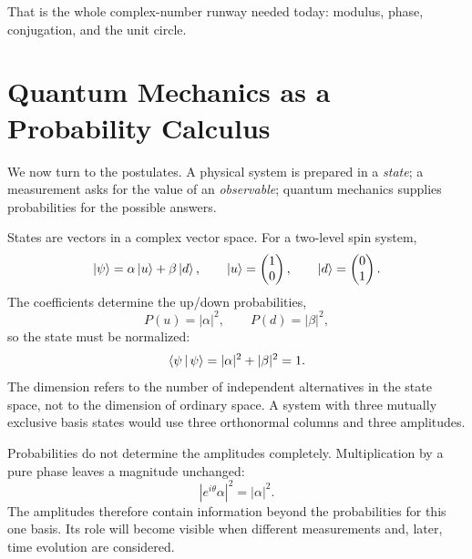 \begin{classroomqa}
\end{classroomqa}

That is the whole complex-number runway needed today: modulus, phase, conjugation, and the unit circle.

\section{Quantum Mechanics as a Probability Calculus}

We now turn to the postulates. A physical system is prepared in a \emph{state}; a measurement asks for the value of an \emph{observable}; quantum mechanics supplies probabilities for the possible answers.

States are vectors in a complex vector space. For a two-level spin system,
\begin{equation}
  \left\lvert\psi\right\rangle=\alpha\left\lvert u\right\rangle+\beta\left\lvert d\right\rangle,
  \qquad
  \left\lvert u\right\rangle=\begin{pmatrix}1\\0\end{pmatrix},
  \qquad
  \left\lvert d\right\rangle=\begin{pmatrix}0\\1\end{pmatrix}.
  \label{eq:l03-two-level-state}
\end{equation}
The coefficients determine the up/down probabilities,
\begin{equation}
  P(u)=|\alpha|^2,
  \qquad
  P(d)=|\beta|^2,
\end{equation}
so the state must be normalized:
\begin{equation}
  \left\langle\psi\,\middle|\,\psi\right\rangle
  =|\alpha|^2+|\beta|^2
  =1.
  \label{eq:l03-state-normalization}
\end{equation}
The dimension refers to the number of independent alternatives in the state space, not to the dimension of ordinary space. A system with three mutually exclusive basis states would use three orthonormal columns and three amplitudes.

Probabilities do not determine the amplitudes completely. Multiplication by a pure phase leaves a magnitude unchanged:
\begin{equation}
  |e^{i\theta}\alpha|^2=|\alpha|^2.
\end{equation}
The amplitudes therefore contain information beyond the probabilities for this one basis. Its role will become visible when different measurements and, later, time evolution are considered.

